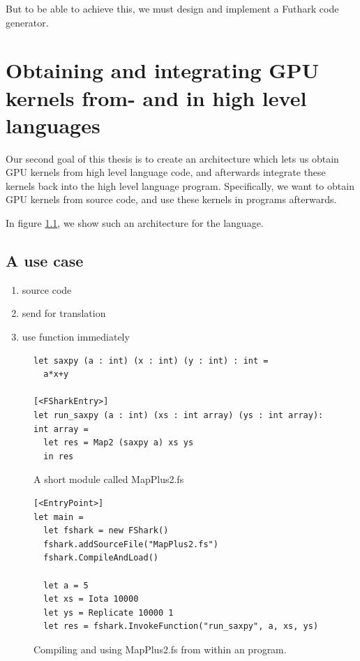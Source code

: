 But to be able to achieve this, we must design and implement a Futhark \csharp{}
code generator.

\section{Obtaining and integrating GPU kernels from- and in high level
  languages}
Our second goal of this thesis is to create an architecture which lets us obtain
GPU kernels from high level language code, and afterwards integrate these
kernels back into the high level language program.
Specifically, we want to obtain GPU kernels from \fsharp{} source code, and
use these kernels in \fsharp{} programs afterwards.

In figure \ref{}, we show such an architecture for the \fsharp{} language.

\subsection{A use case}
\begin{enumerate}
\item  source code
\item  send for translation
\item  use function immediately
\end{enumerate}

\begin{figure}[h]
  \centering
\begin{verbatim}
let saxpy (a : int) (x : int) (y : int) : int =
  a*x+y
  
[<FSharkEntry>]
let run_saxpy (a : int) (xs : int array) (ys : int array): int array =
  let res = Map2 (saxpy a) xs ys
  in res
\end{verbatim}
\caption{A short \fshark{} module called MapPlus2.fs}
\label{fig:shortfsharkprogram0}
\end{figure}


\begin{figure}[h]
  \centering
\begin{verbatim}
[<EntryPoint>]
let main =
  let fshark = new FShark()
  fshark.addSourceFile("MapPlus2.fs")
  fshark.CompileAndLoad()

  let a = 5
  let xs = Iota 10000
  let ys = Replicate 10000 1
  let res = fshark.InvokeFunction("run_saxpy", a, xs, ys)
\end{verbatim}
  \caption{Compiling and using MapPlus2.fs from within an \fsharp{} program.}
  \label{fig:shortfsharkprogram1}
\end{figure}







